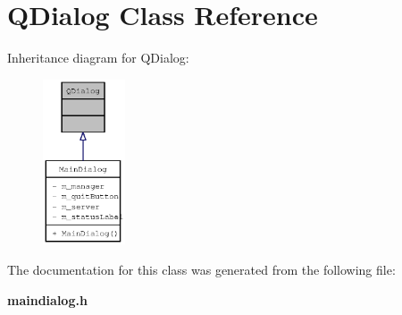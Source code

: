\section{QDialog Class Reference}
\label{classQDialog}
Inheritance diagram for QDialog:\nopagebreak
\begin{figure}[H]
\begin{center}
\leavevmode
\includegraphics[width=69pt]{classQDialog__inherit__graph}
\end{center}
\end{figure}


The documentation for this class was generated from the following file:\begin{CompactItemize}
\item 
{\bf maindialog.h}\end{CompactItemize}
